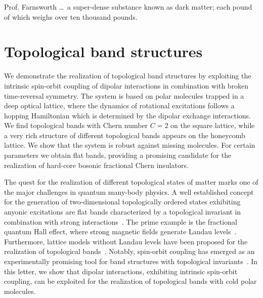 \begin{tquote}{Prof. Farnsworth}
    \ldots~a super-dense substance known as dark matter; each pound of which weighs over ten thousand pounds.
\end{tquote}

\newcommand{\ketp}{\ket{{+}}}
\newcommand{\ketm}{\ket{{-}}}
\newcommand{\ketz}{\ket{{0}}}
\newcommand{\ketpm}{\ket{{\pm}}}
\newcommand{\keto}{\ket{1}}

\chapter{Topological band structures}

We demonstrate the realization of topological band structures by exploiting the intrinsic spin-orbit coupling of dipolar interactions in combination with broken time-reversal symmetry.
The system is based on polar molecules trapped in a deep optical lattice, where the dynamics of rotational excitations follows a hopping Hamiltonian which is determined by the dipolar exchange interactions.
We find topological bands with Chern number $C=2$ on the square lattice, while a very rich structure of different topological bands appears on the honeycomb lattice.
We show that the system is robust against missing molecules.
For certain parameters we obtain flat bands, providing a promising candidate for the realization of hard-core bosonic fractional Chern insulators.

The quest for the realization of different topological states of matter marks one of the major challenges in quantum many-body physics.
A well established concept for the generation of two-dimensional topologically ordered states exhibiting anyonic excitations are flat bands characterized by a topological invariant in combination with strong interactions~\cite{Bergholtz2013,Parameswaran2013}.
The prime example is the fractional quantum Hall effect, where strong magnetic fields generate Landau levels~\cite{Nayak2008}.
Furthermore, lattice models without Landau levels have been proposed for the realization of topological bands~\cite{Haldane1988,Raghu2008,Wang2011,Neupert2011,Wang2012a,Grushin2012,Moller2009,Sun2010,Barkeshli2012,Wang2011a,Sterdyniak2013,Liu2012,Yao2013,Yang2012,Dauphin2012,Cooper2012,Cooper2013,Shi2013}.
Notably, spin-orbit coupling has emerged as an experimentally promising tool for band structures with topological invariants~\cite{Kane2005,Pesin2009,Qi2011,Hasan2010,Tang2011,Qiao2011}.
In this letter, we show that dipolar interactions, exhibiting intrinsic spin-orbit coupling, can be exploited for the realization of topological bands with cold polar molecules.


